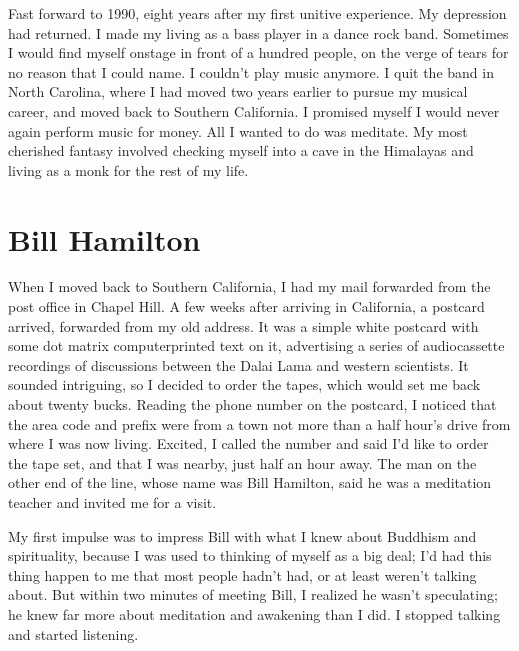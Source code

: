 \documentclass[a5paper,10pt,english]{book}
\begin{document}
\sphinxAtStartPar
Fast forward to 1990, eight years after my first unitive experience. My
depression had returned. I made my living as a bass player in a dance
rock band. Sometimes I would find myself onstage in front of a hundred
people, on the verge of tears for no reason that I could name. I
couldn’t play music anymore. I quit the band in North Carolina, where I
had moved two years earlier to pursue my musical career, and moved back
to Southern California. I promised myself I would never again perform
music for money. All I wanted to do was meditate. My most cherished
fantasy involved checking myself into a cave in the Himalayas and living
as a monk for the rest of my life.


\section{Bill Hamilton}
\label{\detokenize{main-1:bill-hamilton}}
\sphinxAtStartPar
When I moved back to Southern California, I had my mail forwarded from
the post office in Chapel Hill. A few weeks after arriving in
California, a postcard arrived, forwarded from my old address. It was a
simple white postcard with some dot matrix computer\sphinxhyphen{}printed text on it,
advertising a series of audiocassette recordings of discussions between
the Dalai Lama and western scientists. It sounded intriguing, so I
decided to order the tapes, which would set me back about twenty bucks.
Reading the phone number on the postcard, I noticed that the area code
and prefix were from a town not more than a half hour’s drive from where
I was now living. Excited, I called the number and said I’d like to
order the tape set, and that I was nearby, just half an hour away. The
man on the other end of the line, whose name was Bill Hamilton, said he
was a meditation teacher and invited me for a visit.

\sphinxAtStartPar
My first impulse was to impress Bill with what I knew about Buddhism and
spirituality, because I was used to thinking of myself as a big deal;
I’d had this thing happen to me that most people hadn’t had, or at least
weren’t talking about. But within two minutes of meeting Bill, I
realized he wasn’t speculating; he knew far more about meditation and
awakening than I did. I stopped talking and started listening.
\end{document}
